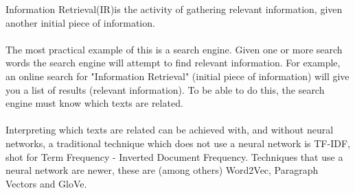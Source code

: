 \documentclass[../../Thesis.tex]{subfiles}
\begin{document}
Information Retrieval(IR)is the activity of gathering relevant information, given another initial piece of information. 
\\\\The most practical example of this is a search engine. Given one or more search words the search engine will attempt to find relevant information. For example, an online search for "Information Retrieval" (initial piece of information) will give you a list of results (relevant information). To be able to do this, the search engine must know which texts are related. \\\\Interpreting which texts are related can be achieved with, and without neural networks, a traditional technique which does not use a neural network is TF-IDF, shot for Term Frequency - Inverted Document Frequency. Techniques that use a neural network are newer, these are (among others) Word2Vec, Paragraph Vectors and GloVe.
\end{document}
